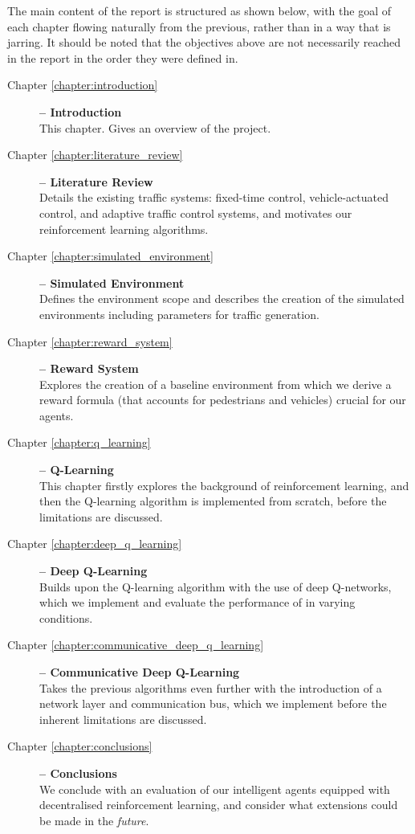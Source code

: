 \documentclass[a4paper]{report}
\begin{document}
The main content of the report is structured as shown below, with the goal of each chapter flowing naturally from the previous, rather than in a way that is jarring. It should be noted that the objectives above are not necessarily reached in the report in the order they were defined in.

\begin{description}
    \item[Chapter \ref{chapter:introduction}] \textbf{-- Introduction} \\ This chapter. Gives an overview of the project.
    \item[Chapter \ref{chapter:literature_review}] \textbf{-- Literature Review} \\ Details the existing traffic systems: fixed-time control, vehicle-actuated control, and adaptive traffic control systems, and motivates our reinforcement learning algorithms. 
    \item[Chapter \ref{chapter:simulated_environment}] \textbf{-- Simulated Environment} \\ Defines the environment scope and describes the creation of the simulated environments including parameters for traffic generation.
    \item[Chapter \ref{chapter:reward_system}] \textbf{-- Reward System} \\ Explores the creation of a baseline environment from which we derive a reward formula (that accounts for pedestrians and vehicles) crucial for our agents.
    \item[Chapter \ref{chapter:q_learning}] \textbf{-- Q-Learning} \\ This chapter firstly explores the background of reinforcement learning, and then the Q-learning algorithm is implemented from scratch, before the limitations are discussed.
    \item[Chapter \ref{chapter:deep_q_learning}] \textbf{-- Deep Q-Learning} \\ Builds upon the Q-learning algorithm with the use of deep Q-networks, which we implement and evaluate the performance of in varying conditions.
    \item[Chapter \ref{chapter:communicative_deep_q_learning}] \textbf{-- Communicative Deep Q-Learning} \\ Takes the previous algorithms even further with the introduction of a network layer and communication bus, which we implement before the inherent limitations are discussed.
    \item[Chapter \ref{chapter:conclusions}] \textbf{-- Conclusions} \\ We conclude with an evaluation of our intelligent agents equipped with decentralised reinforcement learning, and consider what extensions could be made in the \emph{future}.
\end{description}
\end{document}
